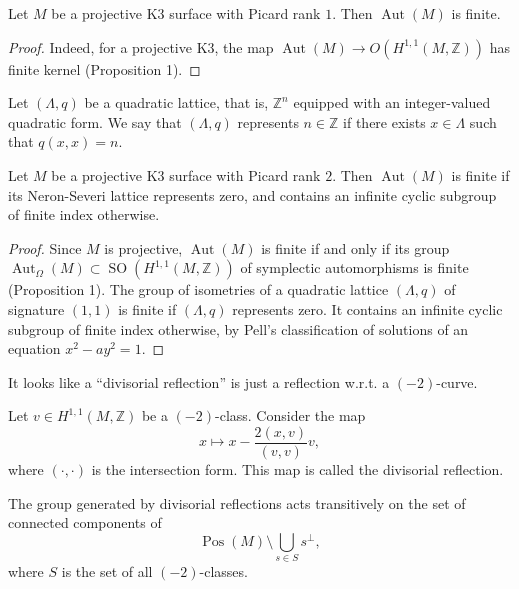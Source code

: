 \begin{lemma}
Let $M$ be a projective K3 surface with Picard
rank $1$. Then $\operatorname{Aut}(M)$ is finite.
\end{lemma}

\begin{proof}
Indeed, for a projective K3, the map
$\operatorname{Aut}(M)\to O(H^{1,1}(M,\mathbb{Z}))$
has finite kernel (Proposition 1).
\end{proof}

\begin{definition}
Let $(\Lambda,q)$ be a quadratic lattice, that is,
$\mathbb{Z}^n$ equipped with an integer-valued
quadratic form. We say that $(\Lambda,q)$
represents $n\in \mathbb{Z}$ if there exists
$x\in \Lambda$ such that $q(x,x)=n$.
\end{definition}

\begin{lemma}
Let $M$ be a projective K3 surface with Picard
rank $2$. Then $\operatorname{Aut}(M)$ is finite if
its Neron-Severi lattice represents zero, and
contains an infinite cyclic subgroup of finite
index otherwise.
\end{lemma}

\begin{proof}
Since $M$ is projective, $\operatorname{Aut}(M)$ is
finite if and only if its group $\operatorname{Aut}_{\Omega}(M)\subset
\operatorname{SO}(H^{1,1}(M,\mathbb{Z}))$ of symplectic
automorphisms is finite (Proposition 1). The group
of isometries of a quadratic lattice $(\Lambda,q)$
of signature $(1,1)$ is finite if $(\Lambda,q)$
represents zero. It contains an infinite cyclic
subgroup of finite index otherwise, by Pell's
classification of solutions of an equation
$x^2-ay^2=1$.
\end{proof}

\noindent
It looks like a ``divisorial
reflection'' is just a reflection
w.r.t. a  $(-2)$-curve.

\begin{definition}
Let $v \in H^{1,1}(M,\mathbb{Z})$ be a $(-2)$-class.
Consider the map
\[
x \mapsto x-\frac{2(x,v)}{(v,v)}v,
\]
where $(\cdot,\cdot)$ is the intersection form.
This map is called the divisorial reflection.
\end{definition}

\begin{lemma}
The group generated by divisorial reflections acts
transitively on the set of connected components of
\[
\operatorname{Pos}(M)\setminus \bigcup_{s\in S}s^\perp,
\]
where $S$ is the set of all $(-2)$-classes.
\end{lemma}


